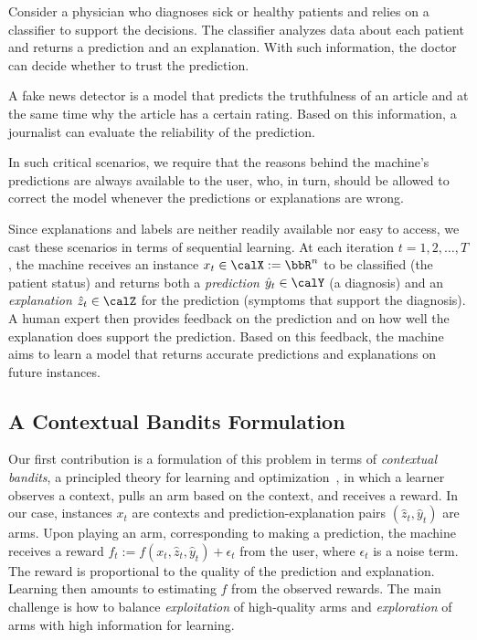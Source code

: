 \documentclass[letterpaper]{article} %
\begin{document}
\begin{example}
Consider a physician who diagnoses sick or healthy patients and relies on a classifier to support the decisions. The classifier analyzes data about each patient and returns a prediction and an explanation.  With such information, the doctor can decide whether to trust the prediction.
\end{example}

\begin{example}
A fake news detector is a model that predicts the truthfulness of an article and at the same time why the article has a certain rating.  Based on this information, a journalist can evaluate the reliability of the prediction.
\end{example}

\noindent
In such critical scenarios, we require that the reasons behind the machine's predictions are always available to the user, who, in turn, should be allowed to correct the model whenever the predictions or explanations are wrong.

Since explanations and labels are neither readily available nor easy to access, we cast these scenarios in terms of sequential learning.  At each iteration $t = 1, 2, \ldots, T$, the machine receives an instance $x_t \in \calX := \bbR^n$ to be classified (the patient status) and returns both a \emph{prediction} $\hat{y}_t \in \calY$ (a diagnosis) and an \emph{explanation} $\hat{z}_t \in \calZ$ for the prediction (symptoms that support the diagnosis).  A human expert then provides feedback on the prediction and on how well the explanation does support the prediction.  Based on this feedback, the machine aims to learn a model that returns accurate predictions and explanations on future instances.


\subsection{A Contextual Bandits Formulation}

Our first contribution is a formulation of this problem in terms of \emph{contextual bandits}, a principled theory  for learning and optimization~\cite{cesa2006prediction,bubeck2012regret}, in which a learner observes a context, pulls an arm based on the context, and receives a reward. 
%
In our case, instances $x_t$ are contexts and prediction-explanation pairs $(\hat{z}_t, \hat{y}_t)$ are arms.  Upon playing an arm, corresponding to making a prediction, the machine receives a reward $f_t := f(x_t, \hat{z}_t, \hat{y}_t) + \epsilon_t$ from the user, where $\epsilon_t$ is a noise term.  The reward is proportional to the quality of the prediction and explanation.  Learning then amounts to estimating $f$ from the observed rewards.  The main challenge is how to balance \emph{exploitation} of high-quality arms and \emph{exploration} of arms with high information for learning.
\end{document}
